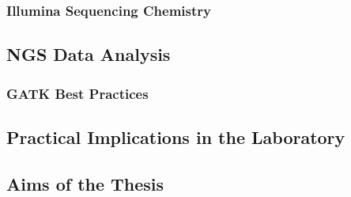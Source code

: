     \subsubsection{Illumina Sequencing Chemistry}

  \subsection{NGS Data Analysis}

    \subsubsection{GATK Best Practices}

  \subsection{Practical Implications in the Laboratory}

  \subsection{Aims of the Thesis}
